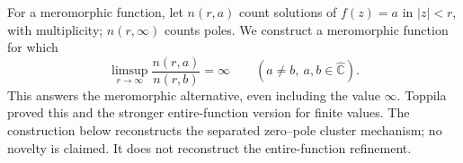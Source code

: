 For a meromorphic function, let $n(r,a)$ count solutions of $f(z)=a$ in $|z|<r$, with multiplicity; $n(r,\infty)$ counts poles. We construct a meromorphic function for which
\[
 \limsup_{r\to\infty}\frac{n(r,a)}{n(r,b)}=\infty
 \qquad(a\ne b,\ a,b\in\widehat{\mathbb C}).
\]
This answers the meromorphic alternative, even including the value $\infty$. Toppila proved this and the stronger entire-function version for finite values. The construction below reconstructs the separated zero--pole cluster mechanism; no novelty is claimed. It does not reconstruct the entire-function refinement.
